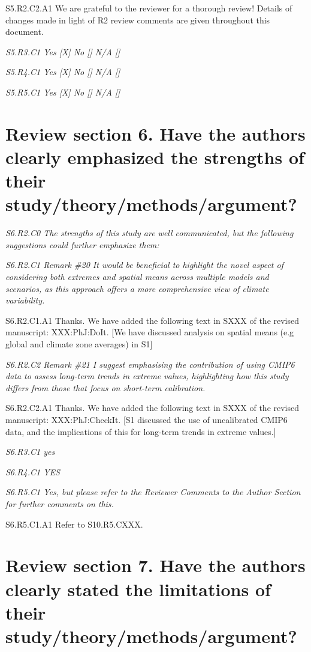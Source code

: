 \documentclass[a4paper,10pt]{article}
\begin{document}
	S5.R2.C2.A1 We are grateful to the reviewer for a thorough review! Details of changes made in light of R2 review comments are given throughout this document.

	\emph{S5.R3.C1 Yes [X] No [] N/A []}

	\emph{S5.R4.C1 Yes [X] No [] N/A []}

	\emph{S5.R5.C1 Yes [X] No [] N/A []}

	\section*{Review section 6. Have the authors clearly emphasized the strengths of their study/theory/methods/argument?}

	\emph{S6.R2.C0 The strengths of this study are well communicated, but the following suggestions could further emphasize them:}

	\emph{S6.R2.C1 Remark \#20 It would be beneficial to highlight the novel aspect of considering both extremes and spatial means across multiple models and scenarios, as this approach offers a more comprehensive view of climate variability.}

	S6.R2.C1.A1 Thanks. We have added the following text in SXXX of the revised manuscript: XXX:PhJ:DoIt. [We have discussed analysis on spatial means (e.g global and climate zone averages) in S1]

	\emph{S6.R2.C2 Remark \#21 I suggest emphasising the contribution of using CMIP6 data to assess long-term trends in extreme values, highlighting how this study differs from those that focus on short-term calibration.}

	S6.R2.C2.A1 Thanks. We have added the following text in SXXX of the revised manuscript: XXX:PhJ:CheckIt. [S1 discussed the use of uncalibrated CMIP6 data, and the implications of this for long-term trends in extreme values.]

	\emph{S6.R3.C1 yes}

	\emph{S6.R4.C1 YES}

	\emph{S6.R5.C1 Yes, but please refer to the Reviewer Comments to the Author Section for further comments on this.}

	S6.R5.C1.A1 Refer to S10.R5.CXXX.

	\section*{Review section 7. Have the authors clearly stated the limitations of their study/theory/methods/argument?}
\end{document}
